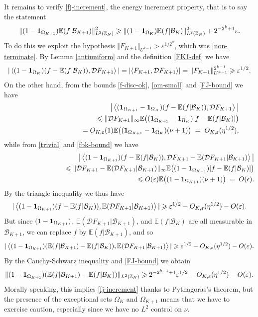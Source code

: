 \documentclass[12pt,a4paper,reqno]{amsart}
\numberwithin{equation}{section}
\theoremstyle{plain}
\theoremstyle{definition}
\renewcommand{\leq}{\leqslant}
\renewcommand{\geq}{\geqslant}
\def\B{{\mathcal B}}
\def\D{{\mathcal D}}
\def\Z{{\mathbb Z}}
\def\E{{\mathbb E}}
\def\eps{{\varepsilon}}
\def\vs{\vspace{11pt}}
\def\ni{\noindent}
\begin{document}
\ni It remains to verify \eqref{fj-increment}, the energy increment property, that is to say the statement
\begin{equation}\label{restate} \| (1 - {\bf 1}_{\Omega_{K+1}}) \E(f|\B_{K+1}) \|_{L^2(\Z_N)}^2 \geq \| (1 - {\bf 1}_{\Omega_K}) \E(f|\B_K) \|_{L^2(\Z_N)}^2 + 2^{-2^k + 1} \eps.\end{equation}
To do this we exploit the hypothesis $\Vert F_{K+1} \Vert_{U^{k-1}} > \eps^{1/2^k}$, which was \eqref{non-terminate}.
By Lemma \ref{antiuniform} and the definition \eqref{FK1-def} we have
 \[
|\left\langle (1 - {\bf 1}_{\Omega_K}) (f-\E(f|\B_K)), \D F_{K+1} \right\rangle| = |\langle F_{K+1}, \D F_{K+1} \rangle| = \| F_{K+1} \|_{U^{k-1}}^{2^{k-1}} \geq \eps^{1/2}.
\]
On the other hand, from the bounds \eqref{f-disc-ok}, \eqref{om-small} and \eqref{FJ-bound} we have
\begin{eqnarray*}
& & 
 \big|\left\langle ({\bf 1}_{\Omega_{K+1}} - {\bf 1}_{\Omega_{K}}) (f-\E(f|\B_K)), \D F_{K+1} \right\rangle \big|  \\ & & \qquad\qquad\qquad\qquad \leq  \Vert \D F_{K+1} \Vert_{\infty} \E \big(({\bf 1}_{\Omega_{K+1}} - {\bf 1}_{\Omega_{K}}) |f - \E(f | \B_K)|\big) \\ &  & \qquad\qquad\qquad\qquad = O_{K,\eps}(1) \E \big(({\bf 1}_{\Omega_{K+1}} - {\bf 1}_{\Omega_{K}}) (\nu + 1)\big) \; = \; O_{K,\eps}(\eta^{1/2}),\end{eqnarray*}
while from \eqref{trivial} and  \eqref{fbk-bound} we have
\begin{eqnarray*}
 & & \big|\left\langle (1 - {\bf 1}_{\Omega_{K+1}}) (f-\E(f|\B_K)), \D F_{K+1} - \E(\D F_{K+1}|\B_{K+1}) \right\rangle\big| \\ & & \qquad\qquad\qquad\qquad \leq  \Vert \D F_{K+1} - \E(\D F_{K+1} | \B_{K+1}) \Vert_{\infty} \E \big((1 - {\bf 1}_{\Omega_{K+1}})|f - \E(f | \B_K)|\big) \\ & & \qquad\qquad\qquad\qquad \leq  O(\eps) \E\big((1 - {\bf 1}_{\Omega_{K+1}})(\nu + 1)\big) \; = \; O(\epsilon).
\end{eqnarray*}
By the triangle inequality we thus have
$$
 |\left\langle (1 - {\bf 1}_{\Omega_{K+1}}) (f-\E(f|\B_K)), \E(\D F_{K+1}|\B_{K+1}) \right\rangle| \geq \eps^{1/2} - O_{K,\eps}(\eta^{1/2}) - O(\eps).
$$
But since $(1 - {\bf 1}_{\Omega_{K+1}})$, $\E(\D F_{K+1}|\B_{K+1})$, and $\E(f|\B_K)$ are all measurable in $\B_{K+1}$, we can replace
$f$ by $\E(f|\B_{K+1})$, and so
$$
 |\left\langle (1 - {\bf 1}_{\Omega_{K+1}}) (\E(f|\B_{K+1})-\E(f|\B_K)), \E(\D F_{K+1}|\B_{K+1}) \right\rangle| \geq \eps^{1/2} - O_{K,\eps}(\eta^{1/2}) - O(\eps).
$$
By the Cauchy-Schwarz inequality and \eqref{FJ-bound} we obtain
\begin{equation}\label{pythagoras-targ}
 \| (1 - {\bf 1}_{\Omega_{K+1}}) (\E(f|\B_{K+1}) - \E(f|\B_K)) \|_{L^2(\Z_N)}
\geq 2^{-2^{k-1}+1} \eps^{1/2} - O_{K,\eps}(\eta^{1/2}) - O(\eps).
\end{equation}
Morally speaking, this implies \eqref{fj-increment} thanks to Pythagoras's theorem, but the presence of the exceptional sets $\Omega_K$ and
$\Omega_{K+1}$ means that we have to exercise caution, especially since we have no $L^2$ control on $\nu$.\vs
\end{document}
